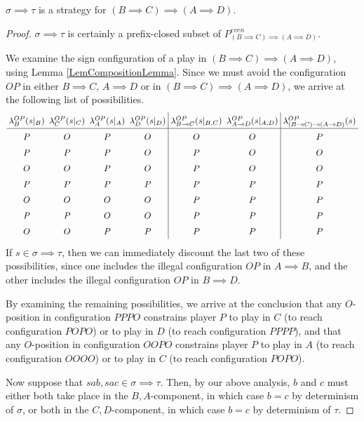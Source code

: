 \documentclass[11pt]{report}
\begin{document}
\begin{proposition}
  $\sigma\implies\tau$ is a strategy for $(B\implies C) \implies (A \implies D)$.
  \label{PropImpliesWellDefined}
\end{proposition}
\begin{proof}
  $\sigma\implies\tau$ is certainly a prefix-closed subset of $P_{(B\implies C)\implies (A \implies D)}^{\textit{even}}$.
  
  We examine the sign configuration of a play in $(B\implies C)\implies (A\implies D)$, using Lemma \ref{LemCompositionLemma}.  
  Since we must avoid the configuration $OP$ in either $B\implies C$, $A\implies D$ or in $(B\implies C)\implies (A\implies D)$, we arrive at the following list of possibilities.
  \scriptsize
  \[
\arraycolsep=2.6pt\def\arraystretch{1.5}
    \begin{array}{cccc|cc|c}
      \lambda_B^{OP}(s\vert_B) & \lambda_C^{OP}(s\vert_C) & \lambda_A^{OP}(s\vert_A) & \lambda_D^{OP}(s\vert_D) & \lambda_{B\implies C}^{OP}(s\vert_{B,C}) & \lambda_{A\implies D}^{OP}(s\vert_{A,D}) & \lambda_{(B\implies C)\implies (A\implies D)}^{OP}(s) \\
      \hline
      P & O & P & O & O & O & P \\
      P & P & P & O & P & O & O \\
      O & O & P & O & P & O & O \\
      P & P & P & P & P & P & P \\
      O & O & O & O & P & P & P \\
      P & P & O & O & P & P & P \\
      O & O & P & P & P & P & P
    \end{array}
    \]
  \normalsize
  If $s\in\sigma\implies\tau$, then we can immediately discount the last two of these possibilities, since one includes the illegal configuration $OP$ in $A\implies B$, and the other includes the illegal configuration $OP$ in $B\implies D$.

  By examining the remaining possibilities, we arrive at the conclusion that any $O$-position in configuration $PPPO$ constrains player $P$ to play in $C$ (to reach configuration $POPO$) or to play in $D$ (to reach configuration $PPPP$), and that any $O$-position in configuration $OOPO$ constrains player $P$ to play in $A$ (to reach configuration $OOOO$) or to play in $C$ (to reach configuration $POPO$).  

  Now suppose that $sab,sac\in\sigma\implies\tau$.  
  Then, by our above analysis, $b$ and $c$ must either both take place in the $B,A$-component, in which case $b = c$ by determinism of $\sigma$, or both in the $C,D$-component, in which case $b = c$ by determinism of $\tau$.  
\end{proof}
\end{document}
